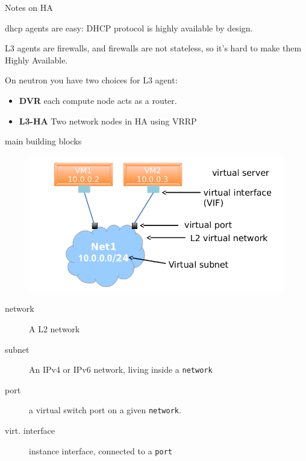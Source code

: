 \documentclass[english,serif,mathserif,xcolor=pdftex,dvipsnames,table]{beamer}
\begin{document}
\begin{frame}
  {Notes on HA} 


  dhcp agents are easy: DHCP protocol is highly available by design.

\+

L3 agents are firewalls, and firewalls are not stateless, so it's hard
to make them Highly Available.

\+

On neutron you have two choices for L3 agent:
  \begin{itemize}
  \item \textbf{DVR} each compute node acts as a router.
  \item \textbf{L3-HA} Two network nodes in HA using VRRP
  \end{itemize}

\end{frame}

\begin{frame}
  {main building blocks}
  \begin{figure}
    \centering
    \includegraphics[width=0.9\linewidth]{neutron_concept}
  \end{figure}
\begin{description}
\item[network] A L2 network
\item[subnet] An IPv4 or IPv6 network, living inside a \texttt{network}
\item[port] a virtual switch port on a given \texttt{network}.
\item[virt. interface] instance interface, connected to a \texttt{port}
\end{description}
\end{frame}
\end{document}
